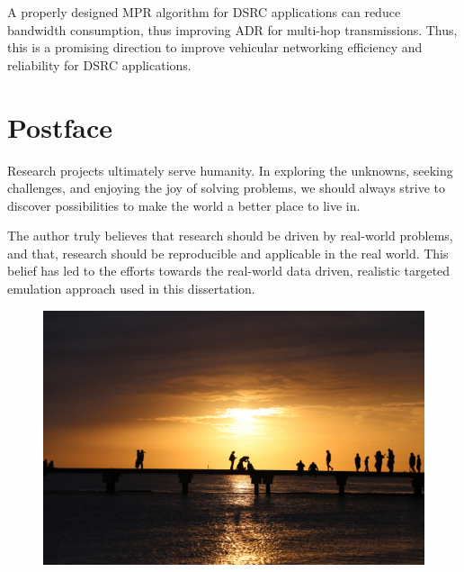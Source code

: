 \documentclass[12pt]{report}
\begin{document}
A properly designed MPR algorithm for DSRC applications can reduce bandwidth consumption, thus improving ADR for multi-hop transmissions. Thus, this is a promising direction to improve vehicular networking efficiency and reliability for DSRC applications.





\chapter*{Postface}
%

Research projects ultimately serve humanity. In exploring the unknowns, seeking challenges, and enjoying the joy of solving problems, we should always strive to discover possibilities to make the world a better place to live in.

The author truly believes that research should be driven by real-world problems, and that, research should be reproducible and applicable in the real world. This belief has led to the efforts towards the real-world data driven, realistic targeted emulation approach used in this dissertation.

\vspace{4em}

\begin{figure}[h]
  \begin{center}
  \includegraphics[width=.8\textwidth]{figures/postface.jpg}
  \end{center}
\end{figure}
\end{document}
